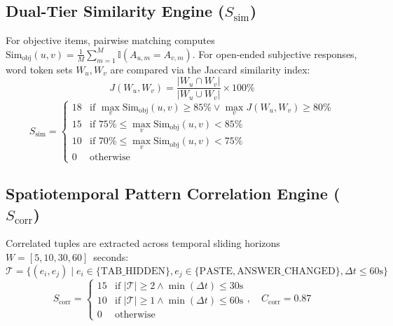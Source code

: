 \documentclass[journal]{IEEEtran}
\begin{document}
\subsection{Dual-Tier Similarity Engine ($S_{\text{sim}}$)}
For objective items, pairwise matching computes $\text{Sim}_{\text{obj}}(u, v) = \frac{1}{M} \sum_{m=1}^M \mathbb{I}(A_{u, m} = A_{v, m})$. For open-ended subjective responses, word token sets $W_u, W_v$ are compared via the Jaccard similarity index:
\begin{equation}
J(W_u, W_v) = \frac{|W_u \cap W_v|}{|W_u \cup W_v|} \times 100\%
\end{equation}
\begin{equation}
S_{\text{sim}} = \begin{cases}
18 & \text{if } \max_{v} \text{Sim}_{\text{obj}}(u, v) \ge 85\% \lor \max_{v} J(W_u, W_v) \ge 80\% \\
15 & \text{if } 75\% \le \max_{v} \text{Sim}_{\text{obj}}(u, v) < 85\% \\
10 & \text{if } 70\% \le \max_{v} \text{Sim}_{\text{obj}}(u, v) < 75\% \\
0  & \text{otherwise}
\end{cases}
\end{equation}

\subsection{Spatiotemporal Pattern Correlation Engine ($S_{\text{corr}}$)}
Correlated tuples are extracted across temporal sliding horizons $W = [5, 10, 30, 60]$~seconds:
\begin{equation}
\mathcal{T} = \{(e_i, e_j) \mid e_i \in \{\text{TAB\_HIDDEN}\}, e_j \in \{\text{PASTE}, \text{ANSWER\_CHANGED}\}, \Delta t \le 60\text{s}\}
\end{equation}
\begin{equation}
S_{\text{corr}} = \begin{cases}
15 & \text{if } |\mathcal{T}| \ge 2 \land \min(\Delta t) \le 30\text{s} \\
10 & \text{if } |\mathcal{T}| \ge 1 \land \min(\Delta t) \le 60\text{s} \\
0  & \text{otherwise}
\end{cases}, \quad C_{\text{corr}} = 0.87
\end{equation}
\end{document}
